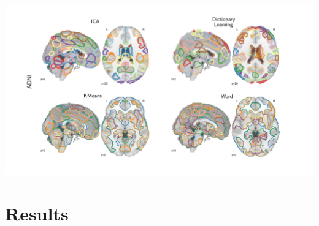 \documentclass[portrait,a0,final]{a0poster} %
\begin{document}
\begin{minipage}{0.98\linewidth}
\begin{minipage}[t]{0.48\linewidth}
\begin{minipage}{0.38\linewidth}
\begin{center}
\includegraphics[width=2.5\linewidth]{figures/rois2.pdf}
\end{center}
\end{minipage}
%

\end{minipage} %
\hspace{0.02\linewidth} %
\begin{minipage}[t]{0.48\linewidth}
\setlength{\parindent}{10mm} %

\section{Results}

\end{minipage}
\end{minipage}
\end{document}
